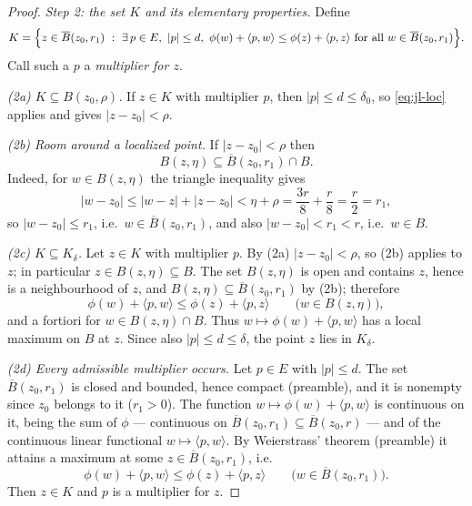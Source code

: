 \begin{proof}
\emph{Step 2: the set $K$ and its elementary properties.}
Define
\[
  K=\Bigl\{z\in\overline B(z_0,r_1)\ :\ \exists\,p\in E,\ |p|\le d,\
    \phi(w)+\langle p,w\rangle\le\phi(z)+\langle p,z\rangle\
    \text{for all}\ w\in\overline B(z_0,r_1)\Bigr\}.
\]
Call such a $p$ a \emph{multiplier for $z$}.

\emph{(2a) $K\subseteq B(z_0,\rho)$.} If $z\in K$ with multiplier $p$, then
$|p|\le d\le\delta_0$, so \eqref{eq:jl-loc} applies and gives $|z-z_0|<\rho$.

\emph{(2b) Room around a localized point.} If $|z-z_0|<\rho$ then
\[
  B(z,\eta)\subseteq\overline B(z_0,r_1)\cap B .
\]
Indeed, for $w\in B(z,\eta)$ the triangle inequality gives
\[
  |w-z_0|\le|w-z|+|z-z_0|<\eta+\rho=\frac{3r}{8}+\frac r8=\frac r2=r_1,
\]
so $|w-z_0|\le r_1$, i.e.\ $w\in\overline B(z_0,r_1)$, and also $|w-z_0|<r_1<r$,
i.e.\ $w\in B$.

\emph{(2c) $K\subseteq K_\delta$.} Let $z\in K$ with multiplier $p$. By (2a)
$|z-z_0|<\rho$, so (2b) applies to $z$; in particular
$z\in B(z,\eta)\subseteq B$. The set $B(z,\eta)$ is open and contains $z$,
hence is a neighbourhood of $z$, and $B(z,\eta)\subseteq\overline B(z_0,r_1)$ by
(2b); therefore
\[
  \phi(w)+\langle p,w\rangle\le\phi(z)+\langle p,z\rangle
  \qquad\bigl(w\in B(z,\eta)\bigr),
\]
and a fortiori for $w\in B(z,\eta)\cap B$. Thus
$w\mapsto\phi(w)+\langle p,w\rangle$ has a local maximum on $B$ at $z$. Since
also $|p|\le d\le\delta$, the point $z$ lies in $K_\delta$.

\emph{(2d) Every admissible multiplier occurs.} Let $p\in E$ with $|p|\le d$.
The set $\overline B(z_0,r_1)$ is closed and bounded, hence compact (preamble),
and it is nonempty since $z_0$ belongs to it ($r_1>0$). The function
$w\mapsto\phi(w)+\langle p,w\rangle$ is continuous on it, being the sum of
$\phi$ --- continuous on $\overline B(z_0,r_1)\subseteq\overline B(z_0,r)$ ---
and of the continuous linear functional $w\mapsto\langle p,w\rangle$. By
Weierstrass' theorem (preamble) it attains a maximum at some
$z\in\overline B(z_0,r_1)$, i.e.
\[
  \phi(w)+\langle p,w\rangle\le\phi(z)+\langle p,z\rangle
  \qquad\bigl(w\in\overline B(z_0,r_1)\bigr).
\]
Then $z\in K$ and $p$ is a multiplier for $z$.


\end{proof}
